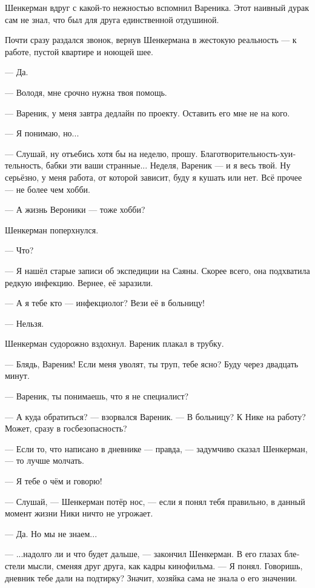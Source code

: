 \documentclass[a5paper,12pt,fleqn]{extbook}\usepackage{cooltooltips}\usepackage{polyglossia}\setdefaultlanguage[babelshorthands=true]{russian}\setotherlanguage{english}\defaultfontfeatures{Ligatures=TeX,Mapping=tex-text} \usepackage{xcolor}\definecolor{lightgray}{HTML}{bbbbbb}\color{lightgray}\newcommand{\ml}[3]{\textenglish{\textcolor{black}{#3}}}
\newcommand{\asterism}{\vspace{1em}{\centering\Large\bfseries$\ast~\ast~\ast$\par}\vspace{1em}}
\begin{document}
Шенкерман вдруг с какой-то нежностью вспомнил Вареника.
Этот наивный дурак сам не знал, что был для друга единственной отдушиной.

Почти сразу раздался звонок, вернув Шенкермана в жестокую реальность --- к работе, пустой квартире и ноющей шее.

--- Да.

--- Володя, мне срочно нужна твоя помощь.

--- Вареник, у меня завтра дедлайн по проекту.
Оставить его мне не на кого.

--- Я понимаю, но...

--- Слушай, ну отъебись хотя бы на неделю, прошу.
Благотворительность-хуительность, бабки эти ваши странные...
Неделя, Вареник --- и я весь твой.
Ну серьёзно, у меня работа, от которой зависит, буду я кушать или нет.
Всё прочее --- не более чем хобби.

--- А жизнь Вероники --- тоже хобби?

Шенкерман поперхнулся.

--- Что?

--- Я нашёл старые записи об экспедиции на Саяны.
Скорее всего, она подхватила редкую инфекцию.
Вернее, её заразили.

--- А я тебе кто --- инфекциолог?
Вези её в больницу!

--- Нельзя.

Шенкерман судорожно вздохнул.
Вареник плакал в трубку.

--- Блядь, Вареник!
Если меня уволят, ты труп, тебе ясно?
Буду через двадцать минут.

\asterism

--- Вареник, ты понимаешь, что я не специалист?

--- А куда обратиться? --- взорвался Вареник.
--- В больницу?
К Нике на работу?
Может, сразу в госбезопасность?

--- Если то, что написано в дневнике --- правда, --- задумчиво сказал Шенкерман, --- то лучше молчать.

--- Я тебе о чём и говорю!

--- Слушай, --- Шенкерман потёр нос, --- если я понял тебя правильно, в данный момент жизни Ники ничто не угрожает.

--- Да.
Но мы не знаем...

--- ...надолго ли и что будет дальше, --- закончил Шенкерман.
В его глазах блестели мысли, сменяя друг друга, как кадры кинофильма.
--- Я понял.
Говоришь, дневник тебе дали на подтирку?
Значит, хозяйка сама не знала о его значении.
\end{document}
